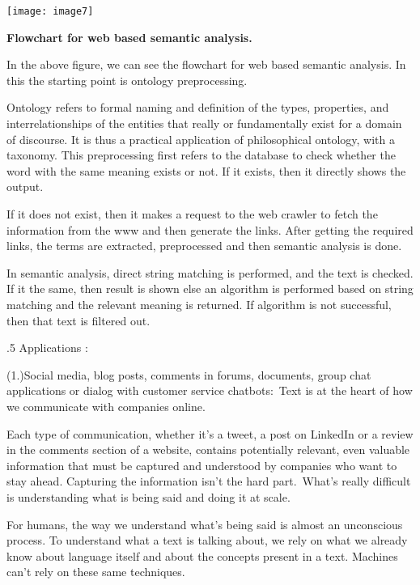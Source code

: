 \documentclass{article} %
\begin{document}
\noindent 

\texttt{[image: image7]}

\textbf{Flowchart for web based semantic analysis.}

In the above figure, we can see the flowchart for web based semantic analysis. In this the starting point is ontology preprocessing. 

Ontology refers to formal naming and definition of the types, properties, and interrelationships of the entities that really or fundamentally exist for a domain of discourse. It is thus a practical application of philosophical ontology, with a taxonomy. This preprocessing first refers to the database to check whether the word with the same meaning exists or not. If it exists, then it directly shows the output. 

If it does not exist, then it makes a request to the web crawler to fetch the information from the www and then generate the links. After getting the required links, the terms are extracted, preprocessed and then semantic analysis is done.

In semantic analysis, direct string matching is performed, and the text is checked. If it the same, then result is shown else an algorithm is performed based on string matching and the relevant meaning is returned. If algorithm is not successful, then that text is filtered out.

\textbf{}



.5 Applications : 

(1.)Social media, blog posts, comments in forums, documents, group chat applications or dialog with customer service chatbots:~Text is at the heart of how we communicate with companies online.

Each type of communication, whether it's a tweet, a post on LinkedIn or a review in the comments section of a website, contains potentially relevant, even valuable information that must be captured and understood by companies who want to stay ahead. Capturing the information isn't the hard part.~What's really difficult is understanding what is being said and doing it at scale.

For humans, the way we understand what's being said is almost an unconscious process. To understand what a text is talking about, we rely on what we already know about language itself and about the concepts present in a text. Machines can't rely on these same techniques.
\end{document}
